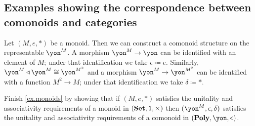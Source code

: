 \documentclass[DynamicalBook]{subfiles}
\begin{document}
\subsection{Examples showing the correspondence between comonoids and categories}

\begin{example}[Monoids]\label{ex.monoids}
Let $(M,e,*)$ be a monoid. Then we can construct a comonoid structure on the representable $\yon^M$. A morphism $\yon^M\to\yon$ can be identified with an element of $M$; under that identification we take $\epsilon\coloneqq e$. Similarly, $\yon^M\tri\yon^M\cong\yon^{M^2}$ and a morphism $\yon^M\to\yon^{M^2}$ can be identified with a function $M^2\to M$; under that identification we take $\delta\coloneqq *$.
\end{example}

\begin{exercise}
Finish \cref{ex.monoids} by showing that if $(M,e,*)$ satisfies the unitality and associativity requirements of a monoid in $(\textbf{Set},\textsf{1},\times)$ then $(\yon^M,\epsilon,\delta)$ satisfies the unitality and associativity requirements of a comonoid in $(\poly,\yon,\tri)$.
\end{exercise}
\end{document}
